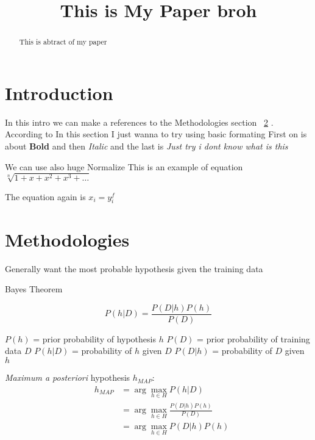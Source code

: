 \documentclass[conference]{IEEEtran}
\begin{document}
\title{This is My Paper broh}
\author{
}

\maketitle

\begin{abstract}
This is abtract of my paper
\end{abstract}

\section{Introduction}
\label{sec:intro}
In this intro we can make a references to the Methodologies section ~\ref{sec:meth} . According to \cite{contoh1}
In this section I just wanna to try using basic formating
First on is about \textbf{Bold} and then \textit{Italic} and the last is {\it Just try i dont know what is this} 

We can use also \huge{huge} \normalsize{Normalize}
This is an example of equation
$ \sqrt[n]{1+x+x^2+x^3+\ldots} $

The equation again is $ x_i = y_i^f $



\section{Methodologies}
\label{sec:meth}



Generally want the most probable hypothesis given the training data


{\huge Bayes Theorem  }

\[ P(h|D) = \frac{P(D|h) P(h)}{P(D)} \]


 $P(h)$ = prior probability of hypothesis $h$
 $P(D)$ = prior probability of training data $D$
 $P(h|D)$ = probability of $h$ given $D$
 $P(D|h)$ = probability of $D$ given $h$

{\em Maximum a posteriori} hypothesis $h_{MAP}$:
\begin{eqnarray}
& h_{MAP} & = \arg \max_{h \in H} P(h|D)\nonumber \\
& & = \arg \max_{h \in H} \frac{P(D|h) P(h)}{P(D)} \nonumber \\
& & = \arg \max_{h \in H}P(D|h) P(h) \nonumber
\end{eqnarray}
\end{document}
